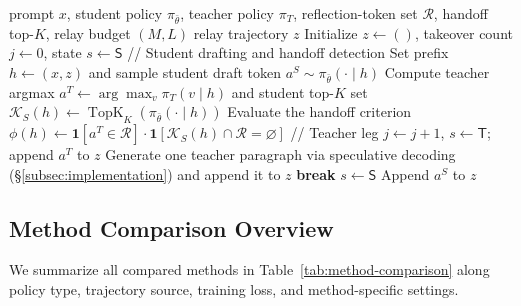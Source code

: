 \documentclass{article} %
\begin{document}
\begin{algorithm}[H]
\caption{Relay Rollout Construction}
\label{alg:relay-rollout}
\begin{algorithmic}[1]
\Require prompt $x$, student policy $\pi_{\bar\theta}$, teacher policy $\pi_T$, reflection-token set $\mathcal R$, handoff top-$K$, relay budget $(M,L)$
\Ensure relay trajectory $z$
\State Initialize $z\leftarrow()$, takeover count $j\leftarrow0$, state $s\leftarrow\mathsf{S}$
    \State \textcolor{green!55!black}{// Student drafting and handoff detection}
    \State Set prefix $h\leftarrow(x,z)$ and sample student draft token $a^S\sim\pi_{\bar\theta}(\cdot\mid h)$
    \State Compute teacher argmax $a^T\leftarrow\arg\max_{v}\pi_T(v\mid h)$ and student top-$K$ set $\mathcal K_S(h)\leftarrow\operatorname{TopK}_K(\pi_{\bar\theta}(\cdot\mid h))$
    \State Evaluate the handoff criterion $\phi(h)\leftarrow\mathbf 1[a^T\in\mathcal R]\cdot\mathbf 1[\mathcal K_S(h)\cap\mathcal R=\varnothing]$
        \State \textcolor{green!55!black}{// Teacher leg}
        \State $j\leftarrow j+1$, $s\leftarrow\mathsf{T}$; append $a^T$ to $z$
            \State Generate one teacher paragraph via speculative decoding (\S\ref{subsec:implementation}) and append it to $z$
        \EndFor
            \State \textbf{break}
        \Else
            \State $s\leftarrow\mathsf{S}$
        \EndIf
    \Else
        \State Append $a^S$ to $z$
    \EndIf
\EndWhile
\end{algorithmic}
\end{algorithm}

\subsection{Method Comparison Overview}\label{app:method-comparison}

We summarize all compared methods in Table~\ref{tab:method-comparison} along policy type, trajectory source, training loss, and method-specific settings.\par
\end{document}
